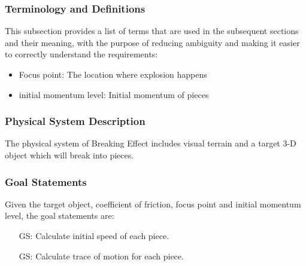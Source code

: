 \documentclass[12pt]{article}
\newcounter{goalnum} %
\newcommand{\progname}{Breaking Effect} %
\begin{document}
	\subsubsection{Terminology and  Definitions}
	
	This subsection provides a list of terms that are used in the subsequent
	sections and their meaning, with the purpose of reducing ambiguity and making it
	easier to correctly understand the requirements:
	
	\begin{itemize}
		
		\item Focus point: The location where explosion happens 
		\item initial momentum level: Initial momentum of pieces  
		
	\end{itemize}
	
	\subsubsection{Physical System Description}
	
	The physical system of \progname{} includes visual terrain  and a target 3-D object which will break into pieces.
	
	
	\subsubsection{Goal Statements}
	
	\noindent Given the target object, coefficient of friction, focus point and initial momentum level, the goal statements are:
	
	\begin{itemize}
		
		\item[GS\refstepcounter{goalnum}\thegoalnum \label{G_speed}:] Calculate initial speed of each piece.​
		
		\item[GS\refstepcounter{goalnum}\thegoalnum \label{G_motion}:] Calculate trace of motion for each piece.
		
	\end{itemize}
	
\end{document}
